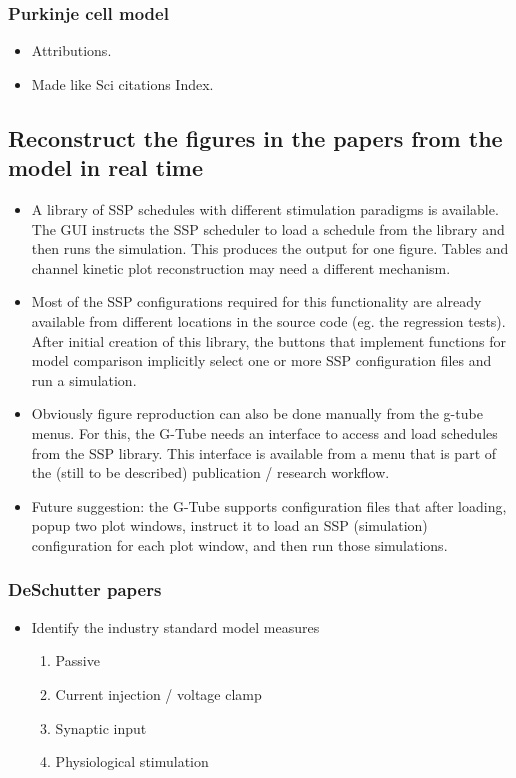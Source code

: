 \documentclass[12pt]{article}
\begin{document}
\subsubsection{Purkinje cell model}
\begin{itemize}
\item Attributions.
\item Made like Sci citations Index.
\end{itemize}


\subsection{Reconstruct the figures in the papers from the model in real time}
\begin{itemize}
\item A library of SSP schedules with different stimulation paradigms
  is available.  The GUI instructs the SSP scheduler to load a
  schedule from the library and then runs the simulation.  This
  produces the output for one figure.  Tables and channel kinetic plot
  reconstruction may need a different mechanism.
\item Most of the SSP configurations required for this functionality
  are already available from different locations in the source code
  (eg. the regression tests).  After initial creation of this library,
  the buttons that implement functions for model comparison implicitly
  select one or more SSP configuration files and run a simulation.
\item Obviously figure reproduction can also be done manually from the
  g-tube menus.  For this, the G-Tube needs an interface to access and
  load schedules from the SSP library.  This interface is available
  from a menu that is part of the (still to be described) publication
  / research workflow.
\item Future suggestion: the G-Tube supports configuration files that
  after loading, popup two plot windows, instruct it to load an SSP
  (simulation) configuration for each plot window, and then run those
  simulations.
\end{itemize}


\subsubsection{DeSchutter papers}
\begin{itemize}
\item Identify the industry standard model measures
  \begin{enumerate}
  \item Passive
  \item Current injection / voltage clamp
  \item Synaptic input
  \item Physiological stimulation
  \end{enumerate}
\end{itemize}
\end{document}
